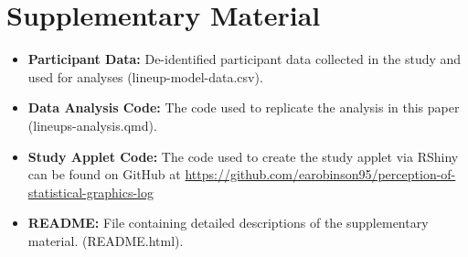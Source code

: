 \documentclass[12pt]{article}
\providecommand{\tightlist}{%
  \setlength{\itemsep}{0pt}\setlength{\parskip}{0pt}}
\begin{document}
\hypertarget{supplementary-material}{%
\section*{Supplementary Material}\label{supplementary-material}}

\begin{itemize}
\tightlist
\item
  \textbf{Participant Data:} De-identified participant data collected in
  the study and used for analyses (lineup-model-data.csv).
\item
  \textbf{Data Analysis Code:} The code used to replicate the analysis
  in this paper (lineups-analysis.qmd).
\item
  \textbf{Study Applet Code:} The code used to create the study applet
  via RShiny can be found on GitHub at
  \url{https://github.com/earobinson95/perception-of-statistical-graphics-log}
\item
  \textbf{README:} File containing detailed descriptions of the
  supplementary material. (README.html).
\end{itemize}


\renewcommand\refname{References}

\end{document}
